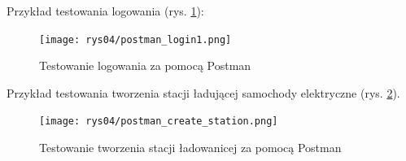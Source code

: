Przykład testowania logowania (rys. \ref{fig:postman_login1}):
\begin{figure}[ht]
    \centering
        \texttt{[image: rys04/postman\_login1.png]}
        \caption{Testowanie logowania za pomocą Postman}
    \label{fig:postman_login1}
\end{figure}

Przykład testowania tworzenia stacji ładującej samochody elektryczne (rys. \ref{fig:postman_create_station}).
\begin{figure}[ht]
    \centering
        \texttt{[image: rys04/postman\_create\_station.png]}
        \caption{Testowanie tworzenia stacji ładowanicej za pomocą Postman}
    \label{fig:postman_create_station}
\end{figure}

